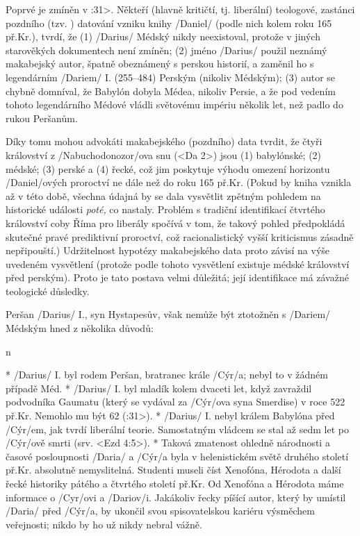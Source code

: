 
\Article [6] %

Poprvé je zmíněn v :31>. Někteří (hlavně kritičtí, tj. liberální) teologové, zastánci pozdního (tzv. ) datování vzniku knihy \x/Daniel/ (podle nich kolem roku 165 př.Kr.),  tvrdí, že
(1) \x/Darius/ Médský nikdy neexistoval, protože v jiných starověkých dokumentech není zmíněn; (2) jméno \x/Darius/ použil neznámý makabejský autor, špatně obeznámený s perskou
historií, a zaměnil ho s legendárním \x/Dariem/ I. (255--484) Perským (nikoliv Médským); (3) autor se chybně domníval, že Babylón dobyla Médea, nikoliv Persie, a že pod vedením tohoto
legendárního  Médové vládli světovému impériu několik let, než padlo do rukou Peršanům.

Díky tomu mohou advokáti makabejského (pozdního) data tvrdit, že čtyři království z \x/Nabuchodonozor/ova snu (<Da 2>) jsou (1) babylónské; (2) médské; (3) perské a (4) řecké, což
jim poskytuje výhodu omezení horizontu \x/Daniel/ových proroctví ne dále než do roku 165 př.Kr. (Pokud by kniha vznikla až v této době, všechna údajná   by se dala vysvětlit zpětným pohledem na historické události {\it poté,\/} co nastaly. Problém s tradiční identifikací čtvrtého království coby Říma pro liberály spočívá v tom, že takový pohled předpokládá skutečné pravé prediktivní proroctví, což racionalistický vyšší kriticismus zásadně nepřipouští.)
Udržitelnost hypotézy makabejského data proto závisí na výše uvedeném vysvětlení  (protože podle tohoto vysvětlení existuje médské království před perským).
Proto je tato postava velmi důležitá; její identifikace má závažné teologické důsledky.

Peršan \x/Darius/ I., syn Hystapesův, však nemůže být ztotožněn  s \x/Dariem/ Médským hned z několika důvodů:

\begitems \style n

* \x/Darius/ I. byl rodem Peršan, bratranec krále \x/Cýr/a; nebyl to v žádném případě Méd.
* \x/Darius/ I. byl mladík kolem dvaceti let, když zavraždil podvodníka Gaumatu (který se vydával za \x/Cýr/ova syna Smerdise) v roce 522 př.Kr.  Nemohlo mu být 62 (:31>). 
* \x/Darius/ I. nebyl králem Babylóna před \x/Cýr/em, jak tvrdí liberální teorie. Samostatným vládcem se stal až sedm let po \x/Cýr/ově smrti (srv. <Ezd 4:5>).
* Taková zmatenost ohledně národnosti a časové posloupnosti \x/Daria/ a \x/Cýr/a byla v helenistickém světě druhého století př.Kr. absolutně nemyslitelná.
Studenti museli číst Xenofóna,  Hérodota a další řecké historiky pátého a čtvrtého století př.Kr. Od Xenofóna a Hérodota máme informace o \x/Cyr/ovi a \x/Dariov/i.
Jakákoliv řecky píšící autor, který by umístil \x/Daria/ před \x/Cýr/a, by ukončil svou spisovatelskou kariéru výsměchem veřejnosti; nikdo by ho už nikdy nebral vážně.  

